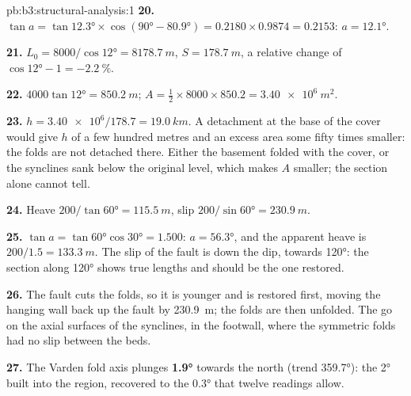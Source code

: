 \begin{solution}{pb:b3:structural-analysis:1}
\textbf{20.} $\tan a = \tan\ang{12.3}\times\cos(\ang{90} - \ang{80.9}) =
0.2180\times0.9874 = 0.2153$: $a = \ang{12.1}$.

\textbf{21.} $L_0 = 8000/\cos\ang{12} = \qty{8178.7}{m}$, $S =
\qty{178.7}{m}$, a relative change of $\cos\ang{12} - 1 =
\qty{-2.2}{\percent}$.

\textbf{22.} $4000\tan\ang{12} = \qty{850.2}{m}$; $A = \tfrac12\times8000\times
850.2 = \qty{3.40e6}{m^2}$.

\textbf{23.} $h = \num{3.40e6}/178.7 = \qty{19.0}{km}$. A detachment at the
base of the cover would give $h$ of a few hundred metres and an excess area
some fifty times smaller: the folds are not detached there. Either the
basement folded with the cover, or the synclines sank below the original
level, which makes $A$ smaller; the section alone cannot tell.

\textbf{24.} Heave $200/\tan\ang{60} = \qty{115.5}{m}$, slip $200/\sin\ang{60}
= \qty{230.9}{m}$.

\textbf{25.} $\tan a = \tan\ang{60}\cos\ang{30} = 1.500$: $a = \ang{56.3}$, and
the apparent heave is $200/1.5 = \qty{133.3}{m}$. The slip of the fault is
down the dip, towards \ang{120}: the section along \ang{120} shows true
lengths and should be the one restored.

\textbf{26.} The fault cuts the folds, so it is younger and is restored first,
moving the hanging wall back up the fault by \qty{230.9}{m}; the folds are
then unfolded. The  go on the axial surfaces of the synclines, in the
footwall, where the symmetric folds had no slip between the beds.

\textbf{27.} The Varden fold axis plunges
\textbf{\ang[text-series-to-math=true]{1.9}} towards the north (trend
\ang{359.7}): the \ang{2} built into the region, recovered to the
\ang{0.3} that twelve readings allow.
\end{solution}
